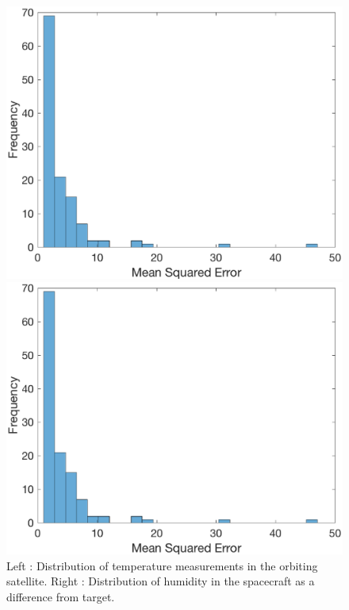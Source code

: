 \documentclass[11pt, a4paper]{article}
\begin{document}
\begin{figure}
\centering
\begin{minipage}{0.45\textwidth}
\centering \includegraphics[width=\linewidth,]{bars.eps}
\end{minipage} \hspace*{0.25cm}
\begin{minipage}{0.45\textwidth}
\centering \includegraphics[width=\linewidth,]{bars.eps}
\end{minipage}
\caption{Left : Distribution of temperature measurements in the orbiting satellite. Right : Distribution of humidity in the spacecraft as a difference from target. \label{twofigs}}
\caprule
\end{figure}
\end{document}
